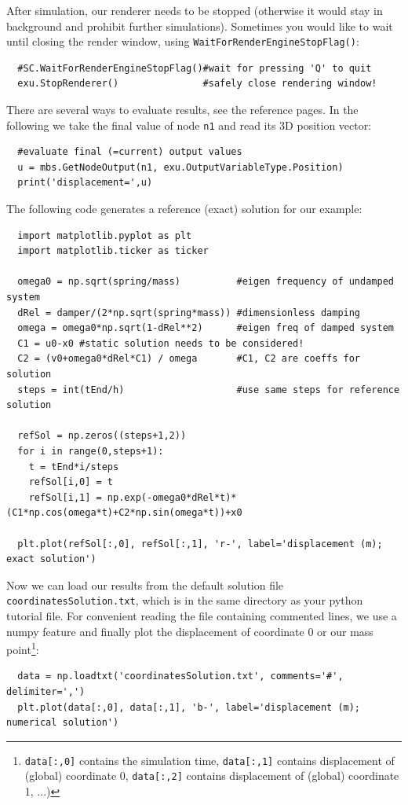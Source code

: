 After simulation, our renderer needs to be stopped (otherwise it would stay in background and prohibit further simulations). 
Sometimes you would like to wait until closing the render window, using \texttt{WaitForRenderEngineStopFlag()}:
\pythonstyle\begin{lstlisting}
  #SC.WaitForRenderEngineStopFlag()#wait for pressing 'Q' to quit
  exu.StopRenderer()               #safely close rendering window!
\end{lstlisting}
%
There are several ways to evaluate results, see the reference pages. In the following we take the final value of node \texttt{n1} and read its 3D position vector:
\pythonstyle\begin{lstlisting}
  #evaluate final (=current) output values
  u = mbs.GetNodeOutput(n1, exu.OutputVariableType.Position)
  print('displacement=',u)
\end{lstlisting}
%
The following code generates a reference (exact) solution for our example:
\pythonstyle\begin{lstlisting}
  import matplotlib.pyplot as plt
  import matplotlib.ticker as ticker

  omega0 = np.sqrt(spring/mass)          #eigen frequency of undamped system
  dRel = damper/(2*np.sqrt(spring*mass)) #dimensionless damping
  omega = omega0*np.sqrt(1-dRel**2)      #eigen freq of damped system
  C1 = u0-x0 #static solution needs to be considered!
  C2 = (v0+omega0*dRel*C1) / omega       #C1, C2 are coeffs for solution
  steps = int(tEnd/h)                    #use same steps for reference solution

  refSol = np.zeros((steps+1,2))
  for i in range(0,steps+1):
    t = tEnd*i/steps
    refSol[i,0] = t
    refSol[i,1] = np.exp(-omega0*dRel*t)*(C1*np.cos(omega*t)+C2*np.sin(omega*t))+x0

  plt.plot(refSol[:,0], refSol[:,1], 'r-', label='displacement (m); exact solution')
\end{lstlisting}
%
Now we can load our results from the default solution file \texttt{coordinatesSolution.txt}, which is in the same
directory as your python tutorial file. For convenient reading the file containing commented lines, we use a numpy feature and
finally plot the displacement of coordinate 0 or our mass point\footnote{\texttt{data[:,0]} contains the simulation time, \texttt{data[:,1]} contains displacement of (global) coordinate 0, \texttt{data[:,2]} contains displacement of (global) coordinate 1, ...)}:
\pythonstyle\begin{lstlisting}
  data = np.loadtxt('coordinatesSolution.txt', comments='#', delimiter=',')
  plt.plot(data[:,0], data[:,1], 'b-', label='displacement (m); numerical solution') 
\end{lstlisting}
